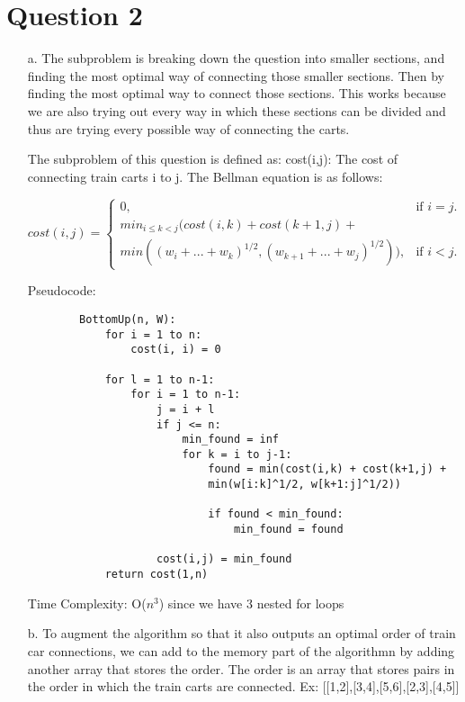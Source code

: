 \documentclass[12pt]{article}
\begin{document}
\section*{Question 2}
\begin{enumerate}
    \item[a.] The subproblem is breaking down the question into smaller sections, and finding the most 
    optimal way of connecting those smaller sections. Then by finding the most optimal way to connect
    those sections. This works because we are also trying out every way in which these sections can be divided
    and thus are trying every possible way of connecting the carts. 
    
    The subproblem of this question is defined as:
    cost(i,j): The cost of connecting train carts i to j. The Bellman equation is as follows:

    \begin{equation}
        cost(i,j)=\begin{cases}
    0, & \text{if $i=j$}.\\
    min_{i \leq k < j}(cost(i,k) + cost(k+1, j) + \\min((w_{i} + ... + w_{k})^{1/2},(w_{k+1} + ... + w_{j})^{1/2})), & \text{if $i < j$}.
    \end{cases}
    \end{equation}

    Pseudocode:
    \begin{verbatim}
        BottomUp(n, W):
            for i = 1 to n:
                cost(i, i) = 0
            
            for l = 1 to n-1:
                for i = 1 to n-1:
                    j = i + l
                    if j <= n:
                        min_found = inf
                        for k = i to j-1:
                            found = min(cost(i,k) + cost(k+1,j) + 
                            min(w[i:k]^1/2, w[k+1:j]^1/2))

                            if found < min_found:
                                min_found = found

                    cost(i,j) = min_found
            return cost(1,n)
    \end{verbatim}

    Time Complexity: O($n^3$) since we have 3 nested for loops 

    \item[b. ] To augment the algorithm so that it also outputs an optimal order
    of train car connections, we can add to the memory part of the algorithmn by
    adding another array that stores the order. The order is an array that stores
    pairs in the order in which the train carts are connected. 
    Ex: [[1,2],[3,4],[5,6],[2,3],[4,5]] 
    

\end{enumerate}
\end{document}
